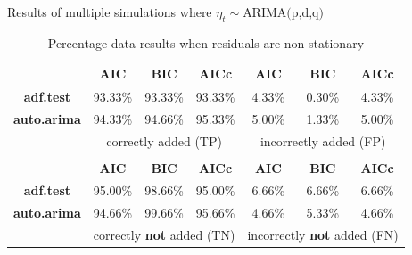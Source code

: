 \documentclass[10pt]{beamer}
\begin{document}
\begin{frame}{Results of multiple simulations where $\eta_t\sim\text{ARIMA(p,d,q)}$}
    \begin{table}
        \centering\small 
        \renewcommand{\arraystretch}{1.3}
        \setlength{\tabcolsep}{10pt}
        \label{simulations2}
        \caption{Percentage data results when residuals are non-stationary}
        \begin{tabular}{|c|ccc|ccc|}
            \cline{2-7}
            \multicolumn{1}{c|}{}   & \textbf{AIC}  & \textbf{BIC}  & \textbf{AICc}            & \textbf{AIC}      & \textbf{BIC}   & \textbf{AICc} \\
            \hline       
            \textbf{adf.test}       & 93.33\%       & 93.33\%        & 93.33\%                 & 4.33\%            & 0.30\%         & 4.33\%        \\
            \textbf{auto.arima}     & 94.33\%       & 94.66\%        & 95.33\%                 & 5.00\%            & 1.33\%         & 5.00\%        \\
            \hline
            \multicolumn{1}{|c|}{}   & \multicolumn{3}{c|}{correctly added (TP)}               & \multicolumn{3}{c|}{incorrectly added (FP)}         \\
            \hline 
            \multicolumn{7}{c}{}                                                                                                                    \\
            \cline{2-7}
            \multicolumn{1}{c|}{}   & \textbf{AIC}  & \textbf{BIC}  & \textbf{AICc}           & \textbf{AIC}      & \textbf{BIC}   & \textbf{AICc}  \\ 
            \hline        
            \textbf{adf.test}       & 95.00\%       & 98.66\%        & 95.00\%                & 6.66\%            & 6.66\%         & 6.66\%         \\
            \textbf{auto.arima}     & 94.66\%       & 99.66\%        & 95.66\%                & 4.66\%            & 5.33\%         & 4.66\%         \\
            \hline 
            \multicolumn{1}{|c|}{}   & \multicolumn{3}{c|}{correctly \textbf{not} added (TN)} & \multicolumn{3}{c|}{incorrectly \textbf{not} added (FN)}  \\
            \hline
        \end{tabular}
    \end{table}
\end{frame}
\end{document}
